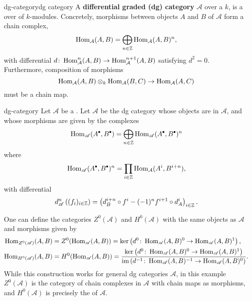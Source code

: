 \begin{topic}{dg-category}{dg category}
    A \textbf{differential graded (dg) category} $\mathcal{A}$ over a  $k$, is a   over  of $k$-modules. Concretely, morphisms between objects $A$ and $B$ of $\mathcal{A}$ form a chain complex,
    \[ \operatorname{Hom}_\mathcal{A}(A, B) = \bigoplus_{n \in \mathbb{Z}} \operatorname{Hom}_\mathcal{A}(A, B)^n , \]
    with differential $d \colon \operatorname{Hom}^n_\mathcal{A}(A, B) \to \operatorname{Hom}^{n + 1}_\mathcal{A}(A, B)$ satisfying $d^2 = 0$. Furthermore, composition of morphisms
    \[ \operatorname{Hom}_\mathcal{A}(A, B) \otimes_k \operatorname{Hom}_\mathcal{A}(B, C) \to \operatorname{Hom}_\mathcal{A}(A, C) \]
    must be a chain map.
\end{topic}

\begin{example}{dg-category}
    Let $\mathcal{A}$ be a . Let $\mathscr{A}$ be the dg category whose objects are  in $\mathcal{A}$, and whose morphisms are given by the complexes
    \[ \Hom_\mathscr{A}(A^\bdot, B^\bdot) = \bigoplus_{n \in \ZZ} \Hom_\mathscr{A}(A^\bdot, B^\bdot)^n \]
    where
    \[ \Hom_\mathscr{A}(A^\bdot, B^\bdot)^n = \prod_{i \in \ZZ} \Hom_\mathcal{A}(A^i, B^{i + n}) , \]
    with differential
    \[ d_\mathscr{A}^n \left( (f_i)_{i \in \mathbb{Z}} \right) = \left( d_B^{i + n} \circ f^i - (-1)^n f^{i + 1} \circ d_A^i \right)_{i \in \mathbb{Z}} . \]
    
    One can define the categories $Z^0(\mathscr{A})$ and $H^0(\mathscr{A})$ with the same objects as $\mathscr{A}$ and morphisms given by
    \[ \begin{aligned}
        \operatorname{Hom}_{Z^0(\mathscr{A})}(A, B) &= Z^0(\operatorname{Hom}_\mathscr{A}(A, B)) = \ker \left(d^0 \colon \operatorname{Hom}_\mathscr{A}(A, B)^0 \to \operatorname{Hom}_\mathscr{A}(A, B)^1 \right) , \\
        \operatorname{Hom}_{H^0(\mathscr{A})}(A, B) &= H^0(\operatorname{Hom}_\mathscr{A}(A, B)) = \frac{\ker \left(d^0 \colon \operatorname{Hom}_\mathscr{A}(A, B)^0 \to \operatorname{Hom}_\mathscr{A}(A, B)^1 \right)}{\operatorname{im} \left(d^{-1} \colon \operatorname{Hom}_\mathscr{A}(A, B)^{-1} \to \operatorname{Hom}_\mathscr{A}(A, B)^{0} \right)} .
    \end{aligned} \]
    While this construction works for general dg categories $\mathscr{A}$, in this example $Z^0(\mathscr{A})$ is the category of chain complexes in $\mathcal{A}$ with chain maps as morphisms, and $H^0(\mathscr{A})$ is precisely the  of $\mathcal{A}$.
\end{example}

